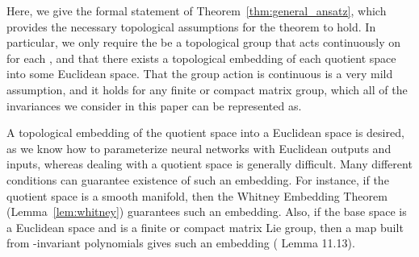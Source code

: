 \documentclass{article} \usepackage{iclr2023_conference,times}
\begin{document}
Here, we give the formal statement of Theorem~\ref{thm:general_ansatz}, which provides the necessary topological assumptions for the theorem to hold. In particular, we only require the  be a topological group that acts continuously on  for each , and that there exists a topological embedding of each quotient space into some Euclidean space. That the group action is continuous is a very mild assumption, and it holds for any finite or compact matrix group, which all of the invariances we consider in this paper can be represented as.

A topological embedding of the quotient space into a Euclidean space is desired, as we know how to parameterize neural networks with Euclidean outputs and inputs, whereas dealing with a quotient space is generally difficult. Many different conditions can guarantee existence of such an embedding.
For instance, if the quotient space is a smooth manifold, then the Whitney Embedding Theorem (Lemma~\ref{lem:whitney}) guarantees such an embedding. Also, if the base space  is a Euclidean space and  is a finite or compact matrix Lie group, then a map built from -invariant polynomials gives such an embedding (\cite{gonzalez2003c} Lemma 11.13).
\end{document}
